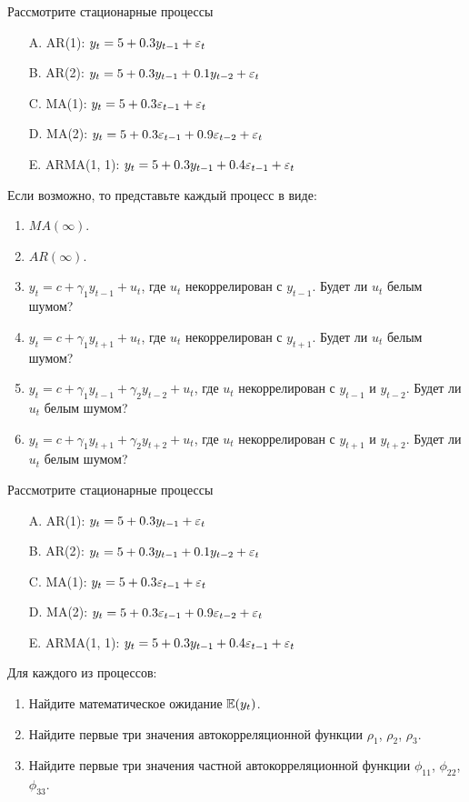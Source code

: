 \begin{problem}
Рассмотрите стационарные процессы
\begin{enumerate}
\item[A.] AR(1): $y_t = 5 + 0.3y_{t-1} + \varepsilon_t$
\item[B.] AR(2): $y_t = 5 + 0.3y_{t-1} + 0.1 y_{t-2} + \varepsilon_t$
\item[C.] MA(1): $y_t = 5 + 0.3\varepsilon_{t-1} + \varepsilon_t$
\item[D.] MA(2): $y_t = 5 + 0.3\varepsilon_{t-1} + 0.9\varepsilon_{t-2} + \varepsilon_t$
\item[E.] ARMA(1, 1): $y_t = 5 + 0.3y_{t-1} + 0.4\varepsilon_{t-1} + \varepsilon_t$
\end{enumerate}

Если возможно, то представьте каждый процесс в виде:
\begin{enumerate}
\item $MA(\infty)$.
\item $AR(\infty)$.
\item $y_t = c + \gamma_1 y_{t-1} + u_t$, где $u_t$ некоррелирован с $y_{t-1}$. Будет ли $u_t$ белым шумом?
\item $y_t = c + \gamma_1 y_{t+1} + u_t$, где $u_t$ некоррелирован с $y_{t+1}$. Будет ли $u_t$ белым шумом?
\item $y_t = c + \gamma_1 y_{t-1} + \gamma_2 y_{t-2} + u_t$, где $u_t$ некоррелирован с $y_{t-1}$ и $y_{t-2}$. 
Будет ли $u_t$ белым шумом?
\item $y_t = c + \gamma_1 y_{t+1} + \gamma_2 y_{t+2} + u_t$, где $u_t$ некоррелирован с $y_{t+1}$ и $y_{t+2}$. 
Будет ли $u_t$ белым шумом?
\end{enumerate}
\begin{sol}
\end{sol}
\end{problem}


\begin{problem}
Рассмотрите стационарные процессы
\begin{enumerate}
\item[A.] AR(1): $y_t = 5 + 0.3y_{t-1} + \varepsilon_t$
\item[B.] AR(2): $y_t = 5 + 0.3y_{t-1} + 0.1 y_{t-2} + \varepsilon_t$
\item[C.] MA(1): $y_t = 5 + 0.3\varepsilon_{t-1} + \varepsilon_t$
\item[D.] MA(2): $y_t = 5 + 0.3\varepsilon_{t-1} + 0.9\varepsilon_{t-2} + \varepsilon_t$
\item[E.] ARMA(1, 1): $y_t = 5 + 0.3y_{t-1} + 0.4\varepsilon_{t-1} + \varepsilon_t$
\end{enumerate}

Для каждого из процессов:
\begin{enumerate}
\item Найдите математическое ожидание $\operatorname{\mathbb{E}}(y_t)$.
\item Найдите первые три значения автокорреляционной функции $\rho_1$, $\rho_2$, $\rho_3$.
\item Найдите первые три значения частной автокорреляционной функции $\phi_{11}$, $\phi_{22}$, $\phi_{33}$.
\end{enumerate}
\begin{sol}
\end{sol}
\end{problem}

